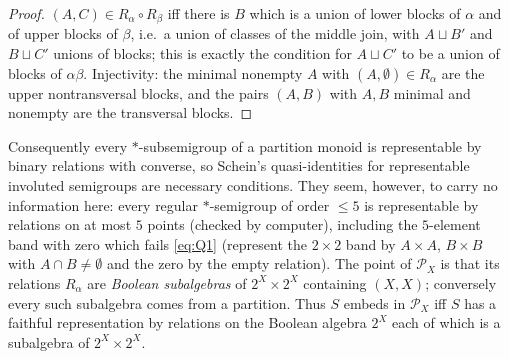 \documentclass[11pt]{amsart}
\theoremstyle{definition}
\renewcommand{\P}{\mathcal{P}}
\begin{document}
\begin{proof}
$(A,C)\in R_\alpha\circ R_\beta$ iff there is $B$ which is a union of lower blocks of $\alpha$ and of upper blocks of $\beta$, i.e.\ a union of classes of the middle join, with $A\sqcup B'$ and $B\sqcup C'$ unions of blocks; this is exactly the condition for $A\sqcup C'$ to be a union of blocks of $\alpha\beta$. Injectivity: the minimal nonempty $A$ with $(A,\emptyset)\in R_\alpha$ are the upper nontransversal blocks, and the pairs $(A,B)$ with $A,B$ minimal and nonempty are the transversal blocks.
\end{proof}

Consequently every $*$-subsemigroup of a partition monoid is representable by binary relations with converse, so Schein's quasi-identities for representable involuted semigroups are necessary conditions. They seem, however, to carry no information here: every regular $*$-semigroup of order $\le5$ is representable by relations on at most $5$ points (checked by computer), including the $5$-element band with zero which fails \eqref{eq:Q1} (represent the $2\times2$ band by $A\times A$, $B\times B$ with $A\cap B\ne\emptyset$ and the zero by the empty relation). The point of $\P_X$ is that its relations $R_\alpha$ are \emph{Boolean subalgebras} of $2^X\times2^X$ containing $(X,X)$; conversely every such subalgebra comes from a partition. Thus $S$ embeds in $\P_X$ iff $S$ has a faithful representation by relations on the Boolean algebra $2^X$ each of which is a subalgebra of $2^X\times 2^X$.
\end{document}
